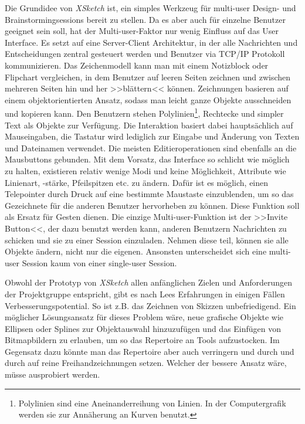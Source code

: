 \medskip Die Grundidee von \emph{XSketch} ist, ein simples Werkzeug für multi-user Design- und Brainstormingsessions bereit zu stellen. Da es aber auch für einzelne Benutzer geeignet sein soll, hat der Multi-user-Faktor nur wenig Einfluss auf das User Interface. Es setzt auf eine Server-Client Architektur, in der alle Nachrichten und Entscheidungen zentral gesteuert werden und Benutzer via TCP/IP Protokoll kommunizieren. Das Zeichenmodell kann man mit einem Notizblock oder Flipchart vergleichen, in dem Benutzer auf leeren Seiten zeichnen und zwischen mehreren Seiten hin und her >>blättern<< können. Zeichnungen basieren auf einem objektorientierten Ansatz, sodass man leicht ganze Objekte ausschneiden und kopieren kann. Den Benutzern stehen Polylinien\footnote{Polylinien sind eine Aneinanderreihung von Linien. In der Computergrafik werden sie zur Annäherung an Kurven benutzt.}, Rechtecke und simpler Text als Objekte zur Verfügung. Die Interaktion basiert dabei hauptsächlich auf Mauseingaben, die Tastatur wird lediglich zur Eingabe und Änderung von Texten und Dateinamen verwendet. Die meisten Editieroperationen sind ebenfalls an die Mausbuttons gebunden. Mit dem Vorsatz, das Interface so schlicht wie möglich zu halten, existieren relativ wenige Modi und keine Möglichkeit, Attribute wie Linienart, -stärke, Pfeilspitzen etc. zu ändern. Dafür ist es möglich, einen Telepointer durch Druck auf eine bestimmte Maustaste einzublenden, um so das Gezeichnete für die anderen Benutzer hervorheben zu können. Diese Funktion soll als Ersatz für Gesten dienen.
Die einzige Multi-user-Funktion ist der >>Invite Button<<, der dazu benutzt werden kann, anderen Benutzern Nachrichten zu schicken und sie zu einer Session einzuladen. Nehmen diese teil, können sie alle Objekte ändern, nicht nur die eigenen. Ansonsten unterscheidet sich eine multi-user Session kaum von einer single-user Session.

\medskip Obwohl der Prototyp von \emph{XSketch} allen anfänglichen Zielen und Anforderungen der Projektgruppe entspricht, gibt es nach Lees Erfahrungen in einigen Fällen Verbesserungspotential. So ist z.B. das Zeichnen von Skizzen unbefriedigend. Ein möglicher Lösungsansatz für dieses Problem wäre, neue grafische Objekte wie Ellipsen oder Splines zur Objektauswahl hinzuzufügen und das Einfügen von Bitmapbildern zu erlauben, um so das Repertoire an Tools aufzustocken. Im Gegensatz dazu könnte man das Repertoire aber auch verringern und durch und durch auf reine Freihandzeichnungen setzen. Welcher der bessere Ansatz wäre, müsse ausprobiert werden.

